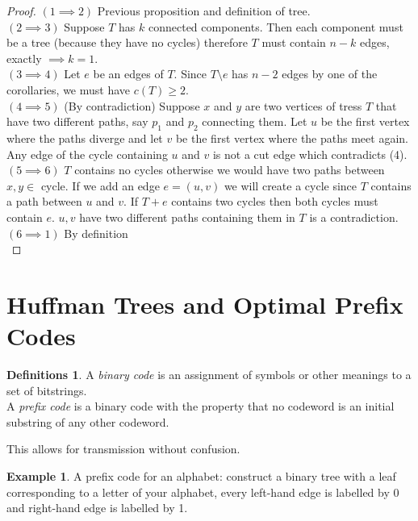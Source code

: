 \documentclass{article}
\theoremstyle{definition}
\newtheorem*{defns}{Definitions}
\newtheorem*{ex}{Example}
\begin{document}
\begin{proof}
$(1\implies 2)$ Previous proposition and definition of tree. \\
$(2\implies 3)$ Suppose $T$ has $k$ connected components.
Then each component must be a tree (because they have no cycles) therefore $T$ must contain $n-k$ edges, exactly $\implies k=1$. \\
$(3\implies 4)$ Let $e$ be an edges of $T$.
Since $T\setminus e$ has $n-2$ edges by one of the corollaries, we must have $c(T)\ge 2$. \\
$(4\implies 5)$ (By contradiction) Suppose $x$ and $y$ are two vertices of tress $T$ that have two different paths, say $p_1$ and $p_2$ connecting them.
Let $u$ be the first vertex where the paths diverge and let $v$ be the first vertex where the paths meet again.
Any edge of the cycle containing $u$ and $v$ is not a cut edge which contradicts (4). \\
$(5\implies 6)$ $T$ contains no cycles otherwise we would have two paths between $x,y\in$ cycle.
If we add an edge $e= (u,v)$ we will create a cycle since $T$ contains a path between $u$ and $v$. If $T+e$ contains two cycles then both cycles must contain $e$.
$u,v$ have two different paths containing them in $T$ is a contradiction. \\
$(6\implies 1)$ \lbrack By definition \rbrack \\
\end{proof}

\section{Huffman Trees and Optimal Prefix Codes}

\begin{defns}
A \emph{binary code} is an assignment of symbols or other meanings to a set of bitstrings.\\
A \emph{prefix code} is a binary code with the property that no codeword is an initial substring of any other codeword.
\end{defns}

This allows for transmission without confusion.

\begin{ex}
A prefix code for an alphabet: construct a binary tree with a leaf corresponding to a letter of your alphabet, every left-hand edge is labelled by 0 and right-hand edge is labelled by 1.
\end{ex}
\end{document}

